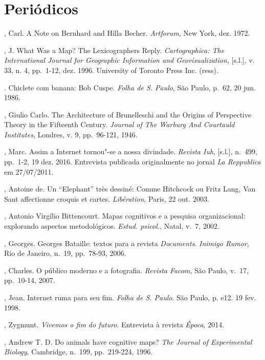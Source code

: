 \section{Periódicos}

\begin{Parskip}
, Carl. A Note on Bernhard and Hilla Becher. \emph{Artforum}, New
York, dez. 1972.

, J. What Was a Map? The Lexicographers Reply.
\emph{Cartographica: The International Journal for Geographic
Information and Geovisualization,} {[}s.l.{]}, v. 33, n. 4, pp.~1-12, dez.
1996. University of Toronto Press Inc. (ress).

. Chiclete com banana: Bob Cuspe. \emph{Folha de S. Paulo}, São
Paulo, p.~62, 20 jun. 1986.

, Giulio Carlo. The Architecture of Brunelleschi and the Origins of
Perspective Theory in the Fifteenth Century. \emph{Journal of The
Warburg And Courtauld Institutes}, Londres, v. 9, pp.~96-121, 1946.

, Marc. Assim a Internet tornou"-se a nossa divindade.
\emph{Revista Iuh}, {[}s.l.{]}, n.~499, pp.~1-2, 19 dez. 2016.
Entrevista publicada originalmente no jornal \emph{La Reppublica} em
27/07/2011. 

, Antoine de. Un ``Elephant'' très dessiné: Comme Hitchcock ou
Fritz Lang, Van Sant affectionne croquis et
cartes. \emph{Libération}, Paris, 22 out. 2003.

, Antonio Virgílio Bittencourt. Mapas cognitivos e a
pesquisa organizacional: explorando aspectos metodológicos. \emph{Estud. psicol.}, Natal, v.~7, 2002.

, Georges. Georges Bataille: textos para a revista \emph{Documents}.
\emph{Inimigo Rumor}, Rio de Janeiro, n.~19, pp.~78-93, 2006.

, Charles. O público moderno e a fotografia. \emph{Revista
Facom}, São Paulo, v.~17, pp.~10-14, 2007.

, Jean. Internet ruma para seu fim. \emph{Folha de S. Paulo}. São Paulo, p. e12. 19 fev. 1998.

, Zygmunt. \emph{Vivemos o fim do futuro}. Entrevista à revista
\emph{Época}, 2014. 

, Andrew T. D. Do animals have cognitive maps? \emph{The
Journal of Experimental Biology}, Cambridge, n.~199, pp.~219-224, 1996.


\end{Parskip}
